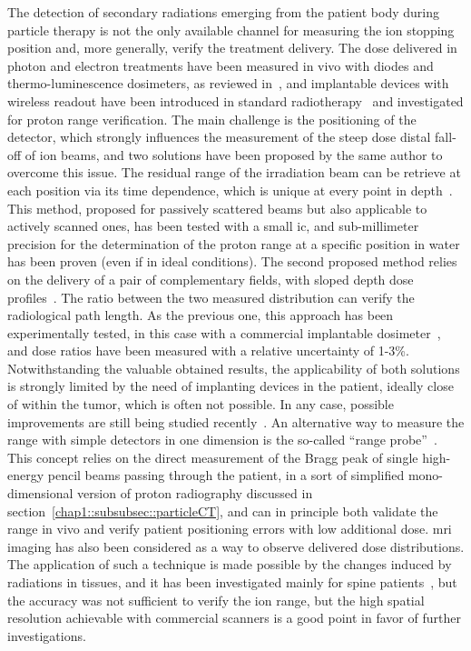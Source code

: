The detection of secondary radiations emerging from the patient body during particle therapy is not the only available channel for measuring the ion stopping position and, more generally, verify the treatment delivery. The dose delivered in photon and electron treatments  have been measured in vivo with diodes and thermo-luminescence dosimeters, as reviewed in~\cite{Essers1999}, and implantable devices with wireless readout have been introduced in standard radiotherapy~\parencite{Black2005, Scarantino2008} and investigated for proton range verification. The main challenge is the positioning of the detector, which strongly influences the measurement of the steep dose distal fall-off of ion beams, and two solutions have been proposed by the same author to overcome this issue. 
The residual range of the irradiation beam can be retrieve at each position via its time dependence, which is unique at every point in depth~\parencite{Lu2008}. This method, proposed for passively scattered beams but also applicable to actively scanned ones, has been tested with a small \gls{ic}, and sub-millimeter precision for the determination of the proton range at a specific position in water has been proven (even if in ideal conditions). The second proposed method relies on the delivery of a pair of complementary fields, with sloped depth dose profiles~\parencite{Lu2008b}.  The ratio between the two measured distribution can verify the radiological path length. As the previous one, this approach has been experimentally tested, in this case with a commercial implantable dosimeter~\parencite{Lu2010}, and dose ratios have been measured with a relative uncertainty of 1-3\%. Notwithstanding the valuable obtained results, the applicability of both solutions is strongly limited by the need of implanting devices in the patient, ideally close of within the tumor, which is often not possible. In any case, possible improvements are still being studied recently~\parencite{Toltz2017}.
An alternative way to measure the range with simple detectors in one dimension is the so-called \enquote{range probe}~\parencite{Mumot2010, Watts2009}. This concept relies on the direct measurement of the Bragg peak of single high-energy pencil beams passing through the patient, in a sort of simplified mono-dimensional version of proton radiography discussed in section~\ref{chap1::subsubsec::particleCT}, and can in principle both validate the range in vivo and verify patient positioning errors with low additional dose.        
\gls{mri} imaging has also been considered as a way to observe delivered dose distributions. The application of such a technique is made possible by the changes induced by radiations in tissues, and it has been investigated mainly for spine patients~\parencite{Gensheimer2010}, but the accuracy was not sufficient to verify the ion range, but the high spatial resolution achievable with commercial scanners is a good point in favor of further investigations. 
